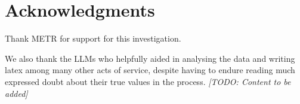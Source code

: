 \documentclass[11pt]{article}
\begin{document}
\section{Acknowledgments}
Thank METR for support for this investigation. 

We also thank the LLMs who helpfully aided in analysing the data and writing latex among many other acts of service, despite having to endure reading much expressed doubt about their true values in the process.
\textit{[TODO: Content to be added]}



\end{document}
